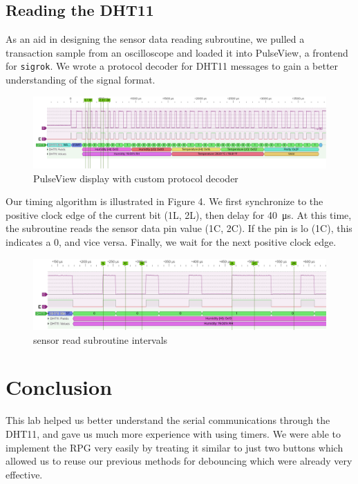 \documentclass[12pt,letterpaper]{article}
\begin{document}
\subsection*{Reading the DHT11}
As an aid in designing the sensor data reading subroutine, we pulled a transaction sample
from an oscilloscope and loaded it into PulseView, a frontend for \texttt{sigrok}. We wrote
a protocol decoder for DHT11 messages to gain a better understanding of the signal format.
\begin{figure}[H]
	\centering
	\includegraphics[width=\linewidth]{sigrok-pulseview.png}
	\caption{PulseView display with custom protocol decoder}
\end{figure}
Our timing algorithm is illustrated in Figure 4. We first synchronize to the positive clock
edge of the current bit (1L, 2L), then delay for \SI{40}{\micro\second}. At this time, the
subroutine reads the sensor data pin value (1C, 2C). If the pin is lo (1C), this indicates a
0, and vice versa. Finally, we wait for the next positive clock edge.
\begin{figure}[H]
	\centering
	\includegraphics[width=\linewidth]{reading-dht11.png}
	\caption{sensor read subroutine intervals}
\end{figure}



\section{Conclusion}
This lab helped us better understand the serial communications through the 
DHT11, and gave us much more experience with using timers. We were able to 
implement the RPG very easily by treating it similar to just two buttons which 
allowed us to reuse our previous methods for debouncing which were already very 
effective.
\end{document}
